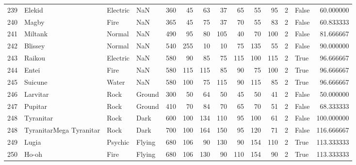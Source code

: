\begin{tabular}{rlllrrrrrrrrlr}
 239 &                     Elekid &  Electric &       NaN &    360 &   45 &      63 &       37 &       65 &       55 &     95 &           2 &      False &   60.000000 \\
 240 &                      Magby &      Fire &       NaN &    365 &   45 &      75 &       37 &       70 &       55 &     83 &           2 &      False &   60.833333 \\
 241 &                    Miltank &    Normal &       NaN &    490 &   95 &      80 &      105 &       40 &       70 &    100 &           2 &      False &   81.666667 \\
 242 &                    Blissey &    Normal &       NaN &    540 &  255 &      10 &       10 &       75 &      135 &     55 &           2 &      False &   90.000000 \\
 243 &                     Raikou &  Electric &       NaN &    580 &   90 &      85 &       75 &      115 &      100 &    115 &           2 &       True &   96.666667 \\
 244 &                      Entei &      Fire &       NaN &    580 &  115 &     115 &       85 &       90 &       75 &    100 &           2 &       True &   96.666667 \\
 245 &                    Suicune &     Water &       NaN &    580 &  100 &      75 &      115 &       90 &      115 &     85 &           2 &       True &   96.666667 \\
 246 &                   Larvitar &      Rock &    Ground &    300 &   50 &      64 &       50 &       45 &       50 &     41 &           2 &      False &   50.000000 \\
 247 &                    Pupitar &      Rock &    Ground &    410 &   70 &      84 &       70 &       65 &       70 &     51 &           2 &      False &   68.333333 \\
 248 &                  Tyranitar &      Rock &      Dark &    600 &  100 &     134 &      110 &       95 &      100 &     61 &           2 &      False &  100.000000 \\
 248 &    TyranitarMega Tyranitar &      Rock &      Dark &    700 &  100 &     164 &      150 &       95 &      120 &     71 &           2 &      False &  116.666667 \\
 249 &                      Lugia &   Psychic &    Flying &    680 &  106 &      90 &      130 &       90 &      154 &    110 &           2 &       True &  113.333333 \\
 250 &                      Ho-oh &      Fire &    Flying &    680 &  106 &     130 &       90 &      110 &      154 &     90 &           2 &       True &  113.333333 \\

\end{tabular}
